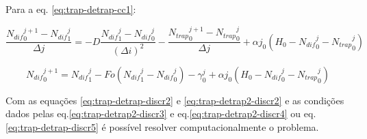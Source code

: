 Para a eq. \ref{eq:trap-detrap-cc1}:

\begin{equation*}
\dfrac{{N_{dif}}_{0}^{j+1} - {N_{dif}}_{1}^{j}}{\Delta j} = -D \dfrac{{N_{dif}}_{1}^{j} - {N_{dif}}_0^{j}}{(\Delta i)^2} - \dfrac{{N_{trap}}_0^{j+1} - {N_{trap}}_0^{j}}{\Delta j} +\alpha j_{0}\left(H_0-{N_{dif}}_0^{j}-{N_{trap}}_0^j\right)
\end{equation*} 

\begin{equation}
\label{eq:trap-detrap-discr5}
{N_{dif}}_{0}^{j+1} = {N_{dif}}_{1}^{j} - Fo({N_{dif}}_{1}^{j} - {N_{dif}}_0^{j}) - \gamma_0^j +\alpha j_{0}\left(H_0-{N_{dif}}_0^{j}-{N_{trap}}_0^j\right)
\end{equation} 

Com as equações \autoref{eq:trap-detrap-discr2} e \autoref{eq:trap-detrap2-discr2} e as condições dados pelas eq.\ref{eq:trap-detrap2-discr3} e eq.\ref{eq:trap-detrap2-discr4} ou eq.\ref{eq:trap-detrap-discr5} é possível resolver computacionalmente o problema.